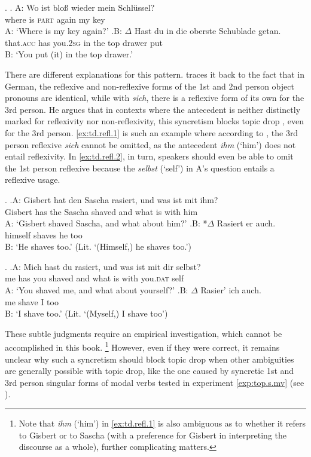 \ex.\label{ex:td.obj.3sg}
\ag. A: Wo ist bloß wieder mein Schlüssel?\\
{} where is \textsc{part} again my key\\
A: `Where is my key again?'
\bg.B: $\Delta$ Hast du in die oberste Schublade getan.\\
{} that.\textsc{acc} has you.\textsc{2sg} in the top drawer put\\
B: `You put (it) in the top drawer.'

There are different explanations for this pattern.
\citet{fries1988} traces it back to the fact that in German, the reflexive and non-reflexive forms of the 1st and 2nd person object pronouns are identical, while with \textit{sich}, there is a reflexive form of its own for the 3rd person. 
He argues that in contexts where the antecedent  is neither distinctly marked for reflexivity nor non-reflexivity, this syncretism  blocks topic drop \citep[33]{fries1988}, even for the 3rd person.
\ref{ex:td.refl.1} is such an example where according to \citet{fries1988}, the 3rd person reflexive \textit{sich} cannot be omitted, as the antecedent \textit{ihm} (`him') does not entail reflexivity.
In \ref{ex:td.refl.2}, in turn, speakers should even be able to omit the 1st person reflexive because the \textit{selbst} (`self') in A's question entails a reflexive usage.

\ex.\label{ex:td.refl.1}
\ag.A: Gisbert hat den Sascha rasiert, und was ist mit ihm?\\
{} Gisbert has the Sascha shaved and what is with him\\
A: `Gisbert shaved Sascha, and what about him?'
\bg.B: *$\Delta$ Rasiert er auch.\\
{} \phantom{*}himself shaves he too\\
B: `He shaves too.' (Lit. `(Himself,) he shaves too.') \citep[33, his judgment]{fries1988}

\ex.\label{ex:td.refl.2}
\ag.A: Mich hast du rasiert, und was ist mit dir selbst?\\
{} me has you shaved and what is with you.\textsc{dat} self\\
A: `You shaved me, and what about yourself?'
\bg.B: $\Delta$ Rasier' ich auch.\\
{} me shave I too\\
B: `I shave too.' (Lit. `(Myself,) I shave too') \citep[33, his judgment]{fries1988}

These subtle judgments require an empirical investigation, which cannot be accomplished in this book.%
\footnote{Note that \textit{ihm} (`him') in \ref{ex:td.refl.1} is also ambiguous  as to whether it refers to Gisbert or to Sascha (with a preference for Gisbert in interpreting the discourse as a whole), further complicating matters.}
%
However, even if they were correct, it remains unclear why such a syncretism should block topic drop when other ambiguities  are generally possible with topic drop, like the one caused by syncretic  1st and 3rd person singular forms of modal verbs  tested in experiment \ref*{exp:top.s.mv} (see ).

